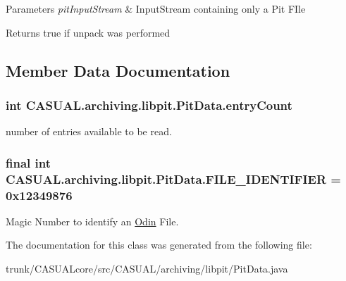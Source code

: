 \begin{DoxyParams}{Parameters}
{\em pit\-Input\-Stream} & Input\-Stream containing only a Pit F\-Ile \\
\hline
\end{DoxyParams}
\begin{DoxyReturn}{Returns}
true if unpack was performed 
\end{DoxyReturn}


\subsection{Member Data Documentation}
\hypertarget{classCASUAL_1_1archiving_1_1libpit_1_1PitData_ab41fe7d1fd169ddedbee537de1c05e13}{
\subsubsection[{entry\-Count}]{\setlength{\rightskip}{0pt plus 5cm}int C\-A\-S\-U\-A\-L.\-archiving.\-libpit.\-Pit\-Data.\-entry\-Count}}\label{classCASUAL_1_1archiving_1_1libpit_1_1PitData_ab41fe7d1fd169ddedbee537de1c05e13}
number of entries available to be read. \hypertarget{classCASUAL_1_1archiving_1_1libpit_1_1PitData_af97b674d87621267c191e126292e4d3b}{
\subsubsection[{F\-I\-L\-E\-\_\-\-I\-D\-E\-N\-T\-I\-F\-I\-E\-R}]{\setlength{\rightskip}{0pt plus 5cm}final int C\-A\-S\-U\-A\-L.\-archiving.\-libpit.\-Pit\-Data.\-F\-I\-L\-E\-\_\-\-I\-D\-E\-N\-T\-I\-F\-I\-E\-R = 0x12349876\hspace{0.3cm}{\ttfamily [static]}}}\label{classCASUAL_1_1archiving_1_1libpit_1_1PitData_af97b674d87621267c191e126292e4d3b}
Magic Number to identify an \hyperlink{classCASUAL_1_1archiving_1_1Odin}{Odin} File. 

The documentation for this class was generated from the following file\-:\begin{DoxyCompactItemize}
\item 
trunk/\-C\-A\-S\-U\-A\-Lcore/src/\-C\-A\-S\-U\-A\-L/archiving/libpit/Pit\-Data.\-java\end{DoxyCompactItemize}
